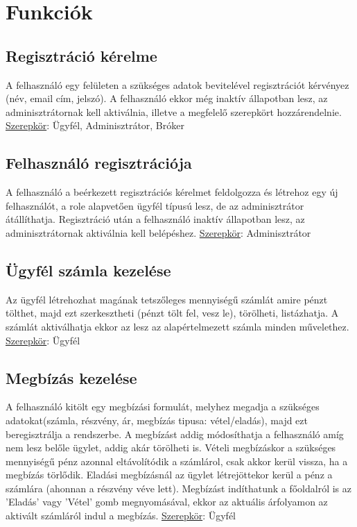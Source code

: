 \section{Funkciók}\label{sect:rsz_funkciok}

\subsection{Regisztráció kérelme}
A felhasználó egy felületen a szükséges adatok bevitelével regisztrációt kérvényez (név, email cím, jelszó). A felhasználó ekkor még inaktív állapotban lesz, az adminisztrátornak kell aktiválnia, illetve a megfelelő szerepkört hozzárendelnie.
\newline \underline{Szerepkör}: Ügyfél, Adminisztrátor, Bróker

\subsection{Felhasználó regisztrációja}
A felhasználó a beérkezett regisztrációs kérelmet feldolgozza és létrehoz egy új felhasználót, a role alapvetően ügyfél típusú lesz, de az adminisztrátor átállíthatja. Regisztráció után a felhasználó inaktív állapotban lesz, az adminisztrátornak aktiválnia kell belépéshez.
\newline \underline{Szerepkör}: Adminisztrátor

\subsection{Ügyfél számla kezelése}
Az ügyfél létrehozhat magának tetszőleges mennyiségű számlát amire pénzt tölthet, majd ezt szerkesztheti (pénzt tölt fel, vesz le), törölheti, listázhatja. A számlát aktiválhatja ekkor az lesz az alapértelmezett számla minden művelethez.
\newline \underline{Szerepkör}: Ügyfél

\subsection{Megbízás kezelése}
 A felhasználó kitölt egy megbízási formulát, melyhez megadja a szükséges adatokat(számla, részvény, ár, megbízás tipusa: vétel/eladás), majd ezt beregisztrálja a rendszerbe. A megbízást addig módosíthatja a felhasználó amíg nem lesz belőle ügylet, addig akár törölheti is. Vételi megbízáskor a szükséges mennyiségű pénz azonnal eltávolítódik a számlárol, csak akkor kerül vissza, ha a megbízás törlődik. Eladási megbízásnál az ügylet létrejöttekor kerül a pénz a számlára (ahonnan a részvény véve lett). Megbízást indíthatunk a főoldalról is az 'Eladás' vagy 'Vétel' gomb megnyomásával, ekkor az aktuális árfolyamon az aktivált számláról indul a megbízás.
\newline \underline{Szerepkör}: Ügyfél

